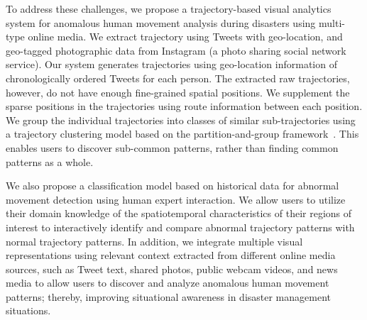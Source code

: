 To address these challenges, we propose a trajectory-based visual analytics system for anomalous human movement analysis during disasters using multi-type online media.
We extract trajectory using Tweets with geo-location, and geo-tagged photographic data from Instagram (a photo sharing social network service).
Our system generates trajectories using geo-location information of chronologically ordered Tweets for each person.
The extracted raw trajectories, however, do not have enough fine-grained spatial positions.
We supplement the sparse positions in the trajectories using route information between each position.
We group the individual trajectories into classes of similar sub-trajectories using a trajectory clustering model based on the partition-and-group framework~\cite{Lee:2007:Trajectory}.
This enables users to discover sub-common patterns, rather than finding common patterns as a whole.

We also propose a classification model based on historical data for abnormal movement detection using human expert interaction.
We allow users to utilize their domain knowledge of the spatiotemporal characteristics of their regions of interest to interactively identify and compare abnormal trajectory patterns with normal trajectory patterns.
In addition, we integrate multiple visual representations using relevant context extracted from different online media sources, such as Tweet text, shared photos, public webcam videos, and news media to allow users to discover and analyze anomalous human movement patterns; thereby, improving situational awareness in disaster management situations. 

